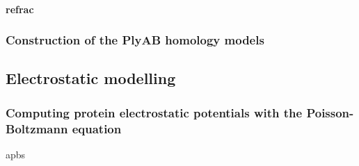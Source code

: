 \paragraph{\gls{refrac}}

\subsubsection{Construction of the PlyAB homology models}


\subsection{Electrostatic modelling}
%

\subsubsection{Computing protein electrostatic potentials with the Poisson-Boltzmann equation}
%

\gls{apbs}

